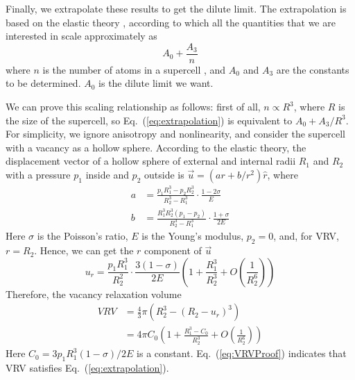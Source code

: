 \documentclass[%
 reprint,
 amsmath,amssymb,
 aps,
]{revtex4-1}
\begin{document}
Finally, we extrapolate these results to get the dilute limit.
The extrapolation is based on the elastic theory \cite{landau2013course}, according to which all the quantities that we are interested in scale approximately as
\begin{equation}
\label{eq:extrapolation}
A_0 + \frac{A_3}{n}
\end{equation}
where $n$ is the number of atoms in a supercell \cite{freysoldt2014first}, and $A_0$ and $A_3$ are the constants to be determined.
$A_0$ is the dilute limit we want.

We can prove this scaling relationship as follows:
first of all, $n\propto R^3$, where $R$ is the size of the supercell, so Eq.~(\ref{eq:extrapolation}) is equivalent to $A_0+A_3/R^3$.
For simplicity, we ignore anisotropy and nonlinearity, and consider the supercell with a vacancy as a hollow sphere.
According to the elastic theory, the displacement vector of a hollow sphere of external and internal radii $R_1$ and $R_2$ with a pressure $p_1$ inside and $p_2$ outside is $\vec{u} = \left(ar + b / r^2\right)\hat{r}$, where
\begin{align}
a &= \frac{p_1R_1^3-p_2R_2^3}{R_2^3-R_1^3}\cdot\frac{1-2\sigma}{E}\\
b &= \frac{R_1^3R_2^3(p_1-p_2)}{R_2^3-R_1^3}\cdot\frac{1+\sigma}{2E}
\end{align}
Here $\sigma$ is the Poisson's ratio, $E$ is the Young's modulus, $p_2=0$, and, for VRV, $r=R_2$. Hence, we can get the $r$ component of $\vec{u}$
\begin{equation}
\label{eq:ur}
u_r = \frac{p_1R_1^3}{R_2^2}\cdot\frac{3\left(1-\sigma\right)}{2E}\left(1+\frac{R_1^3}{R_2^3}+O\left(\frac{1}{R_2^6}\right)\right)
\end{equation}
Therefore, the vacancy relaxation volume
\begin{equation}
\label{eq:VRVProof}
\begin{split}
\mathit{VRV} & = \frac{4}{3}\pi\left(R_2^3-(R_2-u_r)^3\right)\\
 & = 4\pi C_0\left(1 + \frac{R_1^3-C_0}{R_2^3} + O\left(\frac{1}{R_2^6}\right)\right)
\end{split}
\end{equation}
Here $C_0 = 3p_1R_1^3(1-\sigma)/2E$ is a constant.
Eq.~(\ref{eq:VRVProof}) indicates that VRV satisfies Eq.~(\ref{eq:extrapolation}).
\end{document}
